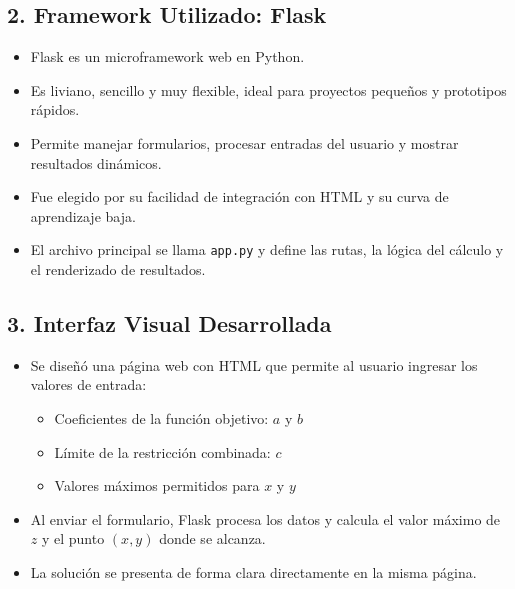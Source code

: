 \documentclass[a4paper,10pt]{article}
\begin{document}
\subsection*{2. Framework Utilizado: Flask}
\begin{itemize}
  \item Flask es un microframework web en Python.
  \item Es liviano, sencillo y muy flexible, ideal para proyectos peque\~nos y prototipos r\'apidos.
  \item Permite manejar formularios, procesar entradas del usuario y mostrar resultados din\'amicos.
  \item Fue elegido por su facilidad de integraci\'on con HTML y su curva de aprendizaje baja.
  \item El archivo principal se llama \texttt{app.py} y define las rutas, la l\'ogica del c\'alculo y el renderizado de resultados.
\end{itemize}

\subsection*{3. Interfaz Visual Desarrollada}
\begin{itemize}
  \item Se dise\~n\'o una p\'agina web con HTML que permite al usuario ingresar los valores de entrada:
  \begin{itemize}
    \item Coeficientes de la funci\'on objetivo: $a$ y $b$
    \item L\'imite de la restricci\'on combinada: $c$
    \item Valores m\'aximos permitidos para $x$ y $y$
  \end{itemize}
  \item Al enviar el formulario, Flask procesa los datos y calcula el valor m\'aximo de $z$ y el punto $(x, y)$ donde se alcanza.
  \item La soluci\'on se presenta de forma clara directamente en la misma p\'agina.
\end{itemize}
\end{document}
